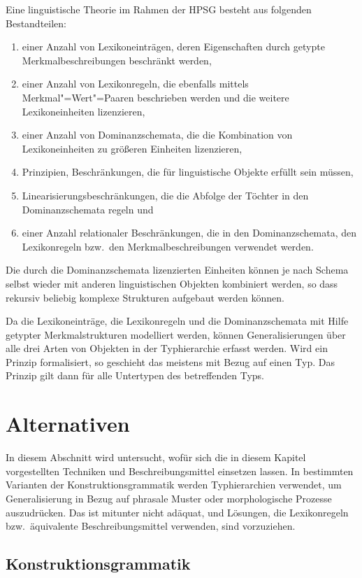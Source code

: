 Eine linguistische Theorie im Rahmen der HPSG besteht aus folgenden Bestandteilen:
\begin{enumerate}
\item einer Anzahl von Lexikoneinträgen, deren Eigenschaften durch getypte Merkmalbeschreibungen beschränkt werden,
\item einer Anzahl von Lexikonregeln, die ebenfalls mittels Merkmal"=Wert"=Paaren beschrieben werden und
      die weitere Lexikoneinheiten lizenzieren,
\item einer Anzahl von Dominanzschemata, die die Kombination von Lexikoneinheiten zu größeren Einheiten
      lizenzieren,
\item Prinzipien, \dash Beschränkungen, die für linguistische Objekte erfüllt sein müssen,
\item Linearisierungsbeschränkungen, die die Abfolge der Töchter in den Dominanzschemata regeln und
\item einer Anzahl relationaler Beschränkungen, die in den Dominanzschemata, den Lexikonregeln bzw.\
      den Merkmalbeschreibungen verwendet werden.
\end{enumerate}
Die durch die Dominanzschemata lizenzierten Einheiten können je nach Schema
selbst wieder mit anderen linguistischen Objekten kombiniert
werden, so dass rekursiv beliebig komplexe Strukturen aufgebaut werden können.

Da die Lexikoneinträge, die Lexikonregeln und die Dominanzschemata mit Hilfe getypter Merkmalstrukturen
modelliert werden, können Generalisierungen über alle drei Arten von Objekten in der Typhierarchie
erfasst werden. Wird ein Prinzip formalisiert, so geschieht das meistens mit Bezug auf einen Typ. Das Prinzip
gilt dann für alle Untertypen des betreffenden Typs.


\section{Alternativen}

\mbox{}%
In diesem Abschnitt wird untersucht, wofür sich die in diesem Kapitel vorgestellten Techniken und Beschreibungsmittel
einsetzen lassen. In bestimmten Varianten der Konstruktionsgrammatik werden Typhierarchien verwendet, um Generalisierung in Bezug
auf phrasale Muster oder morphologische Prozesse auszudrücken. Das ist mitunter nicht adäquat, und Lösungen,
die Lexikonregeln bzw.\ äquivalente Beschreibungsmittel verwenden, sind vorzuziehen.

\subsection{Konstruktionsgrammatik}

